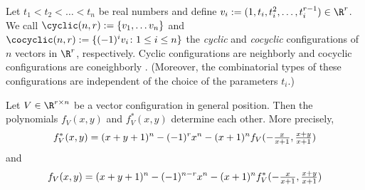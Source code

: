 %
%
\begin{example}
\label{ex:cyclic-cocyclic}
Let $t_1<t_2<\dots<t_n$ be real numbers and define $v_i:= (1,t_i,t_i^2,\dots,t_i^{r-1}) \in \R^r$. We call $\cyclic(n,r):=\{v_1,\dots v_n\}$ and $\cocyclic(n,r):=\{(-1)^i v_i\colon 1\leq i\leq n\}$ the \emph{cyclic} and \emph{cocyclic} configurations of $n$ vectors in $\R^r$, respectively. Cyclic configurations are neighborly and cocyclic configurations are  
coneighborly \cite[Cor. 0.8]{Ziegler:1995aa}. (Moreover, the combinatorial types of these configurations are independent of the choice of the parameters $t_i$.)
\end{example}
%
\begin{theorem} 
\label{thm:f-fstar}
Let $V \in \R^{r\times n}$ be a vector configuration in general position. Then the polynomials $f_V(x,y)$ and $f^*_V(x,y)$ determine each other. More precisely,
\begin{equation}
\label{eq:fstar-f}
\hfill
f^*_V(x,y)=(x+y+1)^n - (-1)^r x^n -(x+1)^n f_V(\textstyle -\frac{x}{x+1},\frac{x+y}{x+1})
\hfill
\end{equation}
and
\begin{equation}
\label{eq:f-fstar}
\hfill
f_V(x,y)=(x+y+1)^n - (-1)^{n-r} x^n -(x+1)^n f^*_V(\textstyle -\frac{x}{x+1},\frac{x+y}{x+1})
\hfill
\end{equation}
\end{theorem}
%
